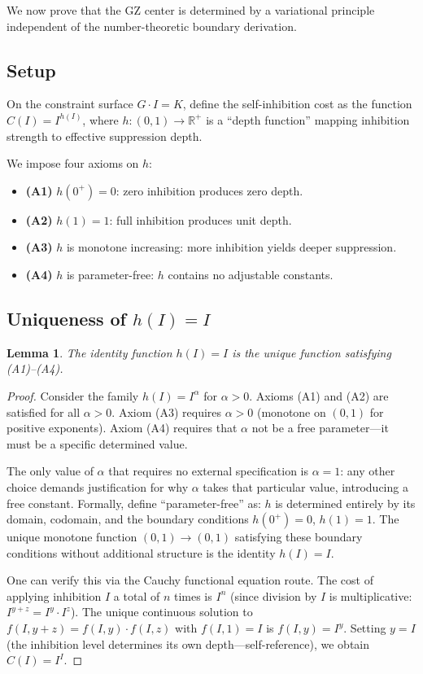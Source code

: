 \documentclass[11pt,a4paper]{article}
\newtheorem{lemma}[theorem]{Lemma}
\begin{document}
We now prove that the GZ center is determined by a variational principle independent of the number-theoretic boundary derivation.

\subsection{Setup}

On the constraint surface $G \cdot I = K$, define the self-inhibition cost as the function $C(I) = I^{h(I)}$, where $h : (0, 1) \to \mathbb{R}^+$ is a ``depth function'' mapping inhibition strength to effective suppression depth.

We impose four axioms on $h$:

\begin{itemize}
  \item \textbf{(A1)} $h(0^+) = 0$: zero inhibition produces zero depth.
  \item \textbf{(A2)} $h(1) = 1$: full inhibition produces unit depth.
  \item \textbf{(A3)} $h$ is monotone increasing: more inhibition yields deeper suppression.
  \item \textbf{(A4)} $h$ is parameter-free: $h$ contains no adjustable constants.
\end{itemize}

\subsection{Uniqueness of $h(I) = I$}

\begin{lemma}
The identity function $h(I) = I$ is the unique function satisfying \emph{(A1)--(A4)}.
\end{lemma}

\begin{proof}
Consider the family $h(I) = I^\alpha$ for $\alpha > 0$. Axioms (A1) and (A2) are satisfied for all $\alpha > 0$. Axiom (A3) requires $\alpha > 0$ (monotone on $(0,1)$ for positive exponents). Axiom (A4) requires that $\alpha$ not be a free parameter---it must be a specific determined value.

The only value of $\alpha$ that requires no external specification is $\alpha = 1$: any other choice demands justification for why $\alpha$ takes that particular value, introducing a free constant. Formally, define ``parameter-free'' as: $h$ is determined entirely by its domain, codomain, and the boundary conditions $h(0^+) = 0$, $h(1) = 1$. The unique monotone function $(0, 1) \to (0, 1)$ satisfying these boundary conditions without additional structure is the identity $h(I) = I$.

One can verify this via the Cauchy functional equation route. The cost of applying inhibition $I$ a total of $n$ times is $I^n$ (since division by $I$ is multiplicative: $I^{y+z} = I^y \cdot I^z$). The unique continuous solution to $f(I, y+z) = f(I, y) \cdot f(I, z)$ with $f(I, 1) = I$ is $f(I, y) = I^y$. Setting $y = I$ (the inhibition level determines its own depth---self-reference), we obtain $C(I) = I^I$.
\end{proof}
\end{document}

